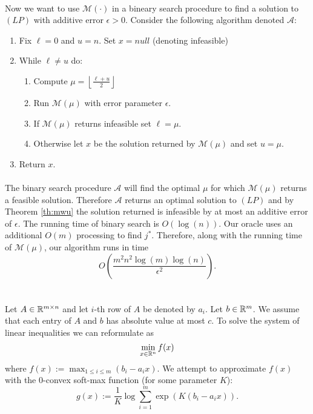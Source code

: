 \documentclass[letterpaper,12pt,oneside,onecolumn]{article}
\newcommand{\cA}{\mathcal{A}} \newcommand{\cB}{\mathcal{B}}
\newcommand{\cM}{\mathcal{M}} \newcommand{\cN}{\mathcal{N}}
\newcommand{\floor}[1]{\ensuremath{\left\lfloor#1\right\rfloor}}
\begin{document}
\paragraph{}
Now we want to use $\cM(\cdot)$ in a bineary search procedure to find a solution to $(LP)$ with additive error $\epsilon>0$. Consider the following algorithm denoted $\cA$:
\begin{enumerate}
\item Fix $\ell = 0$ and $u = n$. Set $x = null$ (denoting infeasible)
\item While $\ell \neq u$ do:
	\begin{enumerate}
	\item Compute $\mu = \floor{\frac{\ell + u}{2}}$
	\item Run $\cM(\mu)$ with error parameter $\epsilon$.
	\item If $\cM(\mu)$ returns infeasible set $\ell = \mu$.
	\item Otherwise let $x$ be the solution returned by $\cM(\mu)$ and set $u = \mu$.
	\end{enumerate}
\item Return $x$.
\end{enumerate}
\paragraph{}
The binary search procedure $\cA$ will find the optimal $\mu$ for which $\cM(\mu)$ returns a feasible solution. Therefore $\cA$ returns an optimal solution to $(LP)$ and by Theorem \ref{th:mwu} the solution returned is infeasible by at most an additive error of $\epsilon$. The running time of binary search is $O(\log(n))$. Our oracle uses an additional $O(m)$ processing to find $j^*$. Therefore, along with the running time of $\cM(\mu)$, our algorithm runs in time
$$O(\frac{m^2n^2\log(m)\log(n)}{\epsilon^2}).$$
\section{}
\paragraph{}
Let $A \in \mathbb{R}^{m\times n}$ and let $i$-th row of $A$ be denoted by $a_i$. Let $b \in \mathbb{R}^m$. We assume that each entry of $A$ and $b$ has absolute value at most $c$. To solve the system of linear inequalities we can reformulate as
$$\min_{x \in \mathbb{R}^n} f(x)$$
where $f(x) :=\max_{1\leq i \leq m} (b_i - a_ix)$. We attempt to approximate $f(x)$ with the $0$-convex soft-max function (for some parameter $K$):
$$g(x) := \frac{1}{K}\log \sum_{i=1}^m \exp (K(b_i - a_i x)).$$
\end{document}
